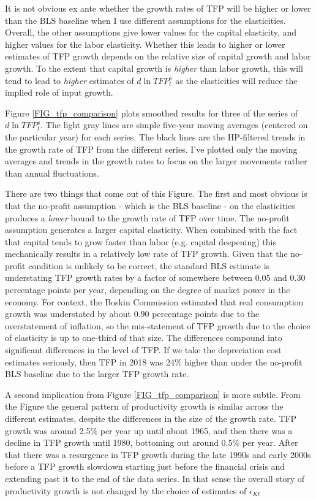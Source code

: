 \documentclass[11pt]{article}
\begin{document}
It is not obvious ex ante whether the growth rates of TFP will be higher or lower than the BLS baseline when I use different assumptions for the elasticities. Overall, the other assumptions give lower values for the capital elasticity, and higher values for the labor elasticity. Whether this leads to higher or lower estimates of TFP growth depends on the relative size of capital growth and labor growth. To the extent that capital growth is \textit{higher} than labor growth, this will tend to lead to \textit{higher} estimates of $d \ln TFP^s_t$ as the elasticities will reduce the implied role of input growth. 

Figure \ref{FIG_tfp_comparison} plots smoothed results for three of the series of $d \ln TFP^s_t$. The light gray lines are simple five-year moving averages (centered on the particular year) for each series. The black lines are the HP-filtered trends in the growth rate of TFP from the different series. I've plotted only the moving averages and trends in the growth rates to focus on the larger movements rather than annual fluctuations. 

There are two things that come out of this Figure. The first and most obvious is that the no-profit assumption - which is the BLS baseline - on the elasticities produces a \textit{lower} bound to the growth rate of TFP over time. The no-profit assumption generates a larger capital elasticity. When combined with the fact that capital tends to grow faster than labor (e.g. capital deepening) this mechanically results in a relatively low rate of TFP growth. Given that the no-profit condition is unlikely to be correct, the standard BLS estimate is understating TFP growth rates by a factor of somewhere between 0.05 and 0.30 percentage points per year, depending on the degree of market power in the economy. For context, the Boskin Commission \citep{boskin1996} estimated that real consumption growth was understated by about 0.90 percentage points due to the overstatement of inflation, so the mis-statement of TFP growth due to the choice of elasticity is up to one-third of that size. The differences compound into significant differences in the level of TFP. If we take the depreciation cost estimates seriously, then TFP in 2018 was 24\% higher than under the no-profit BLS baseline due to the larger TFP growth rate. 

A second implication from Figure \ref{FIG_tfp_comparison} is more subtle. From the Figure the general pattern of productivity growth is similar across the different estimates, despite the differences in the size of the growth rate. TFP growth was around 2.5\% per year up until about 1965, and then there was a decline in TFP growth until 1980, bottoming out around 0.5\% per year. After that there was a resurgence in TFP growth during the late 1990s and early 2000s before a TFP growth slowdown starting just before the financial crisis and extending past it to the end of the data series. In that sense the overall story of productivity growth is not changed by the choice of estimates of $\epsilon_{Kt}$
\end{document}
